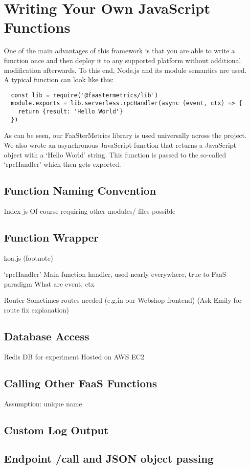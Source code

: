\documentclass[../main.tex]{subfiles}
\begin{document}
\section{Writing Your Own JavaScript Functions}\label{sec:jsFunctions}

One of the main advantages of this framework is that you are able to write a function once 
and then deploy it to any supported platform without additional modification afterwards.
To this end, Node.js and its module semantics are used. A typical function can look like this:

\begin{verbatim}
  const lib = require('@faastermetrics/lib')
  module.exports = lib.serverless.rpcHandler(async (event, ctx) => {
    return {result: 'Hello World'}
  })
\end{verbatim}

As can be seen, our FaaSterMetrics library is used universally across the project. We also wrote an asynchronous JavaScript function that returns a JavaScript object with a ‘Hello World’ string. This function is passed to the so-called ‘rpcHandler’ which then gets exported. 

\subsection{Function Naming Convention}

Index js
Of course requiring other modules/ files possible

\subsection{Function Wrapper}
koa.js (footnote)

`rpcHandler'
Main function handler, used nearly everywhere, true to FaaS paradigm
What are event, ctx

Router
Sometimes routes needed (e.g.\@ in our Webshop frontend)
(Ask Emily for route fix explanation)

\subsection{Database Access}
Redis DB for experiment
Hosted on AWS EC2

\subsection{Calling Other FaaS Functions}
Assumption: unique name


\subsection{Custom Log Output}

\subsection{Endpoint /call and JSON object passing}
\end{document}
